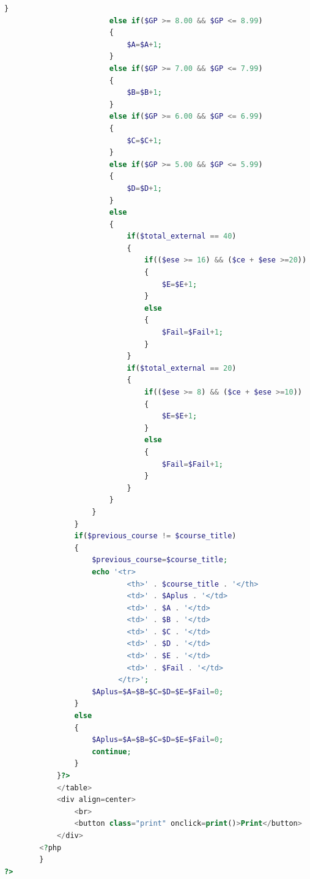 \documentclass{nascproject}
\begin{document}
\begin{appendices}
\begin{lstlisting}[language=php]
                        }
                        else if($GP >= 8.00 && $GP <= 8.99)
                        {
                            $A=$A+1;
                        }
                        else if($GP >= 7.00 && $GP <= 7.99)
                        {
                            $B=$B+1;
                        }
                        else if($GP >= 6.00 && $GP <= 6.99)
                        {
                            $C=$C+1;
                        }
                        else if($GP >= 5.00 && $GP <= 5.99)
                        {
                            $D=$D+1;
                        }
                        else
                        {
                            if($total_external == 40)
                            {
                                if(($ese >= 16) && ($ce + $ese >=20))
                                {   
                                    $E=$E+1;
                                }
                                else
                                {
                                    $Fail=$Fail+1;
                                }
                            }
                            if($total_external == 20)
                            {
                                if(($ese >= 8) && ($ce + $ese >=10))
                                {   
                                    $E=$E+1;
                                }
                                else
                                {
                                    $Fail=$Fail+1;
                                }
                            }
                        }
                    }
                }
                if($previous_course != $course_title)
                {
                    $previous_course=$course_title;
                    echo '<tr>
                            <th>' . $course_title . '</th> 
                            <td>' . $Aplus . '</td>
                            <td>' . $A . '</td>
                            <td>' . $B . '</td>
                            <td>' . $C . '</td>
                            <td>' . $D . '</td>
                            <td>' . $E . '</td>
                            <td>' . $Fail . '</td>
                          </tr>';
                    $Aplus=$A=$B=$C=$D=$E=$Fail=0;  
                }
                else
                {
                    $Aplus=$A=$B=$C=$D=$E=$Fail=0;
                    continue;
                }
            }?>
            </table>
            <div align=center>
                <br>
                <button class="print" onclick=print()>Print</button>
            </div>
        <?php 
        }   
?>  
\end{lstlisting}
\end{appendices}
\end{document}
